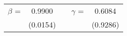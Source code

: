 \begin{tabular}{ccccc}
$\beta$ = & 0.9900 & & $\gamma$ = & 0.6084 \\
& (0.0154) & & & (0.9286)
\end{tabular}